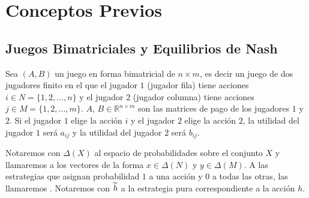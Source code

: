 \chapter{Conceptos Previos}  \label{cap:previos}

\section{Juegos Bimatriciales y Equilibrios de Nash}



Sea $(A, B)$ un juego en forma bimatricial de $n \times m$, es decir un juego de dos jugadores finito en el que el jugador $1$ (jugador fila) tiene acciones $i \in N = \{1, 2, ..., n\}$ y el jugador $2$ (jugador columna) tiene acciones $j \in M = \{1, 2, ..., m\}$. $A$, $B \in \mathbb{R}^{n \times m}$ son las matrices de pago de los jugadores $1$ y $2$. Si el jugador $1$ elige la acción $i$ y el jugador $2$ elige la acción $2$, la utilidad del jugador $1$ será $a_{ij}$ y la utilidad del jugador $2$ será $b_{ij}$.

Notaremos con $\Delta(X)$ al espacio de probabilidades sobre el conjunto $X$ y llamaremos  a los vectores de la forma $x \in \Delta(N)$ y $y \in \Delta(M)$. A las estrategias que asignan probabilidad $1$ a una acción y $0$ a todas las otras, las llamaremos . Notaremos con $\widetilde{h}$ a la estrategia pura correspondiente a la acción $h$.

